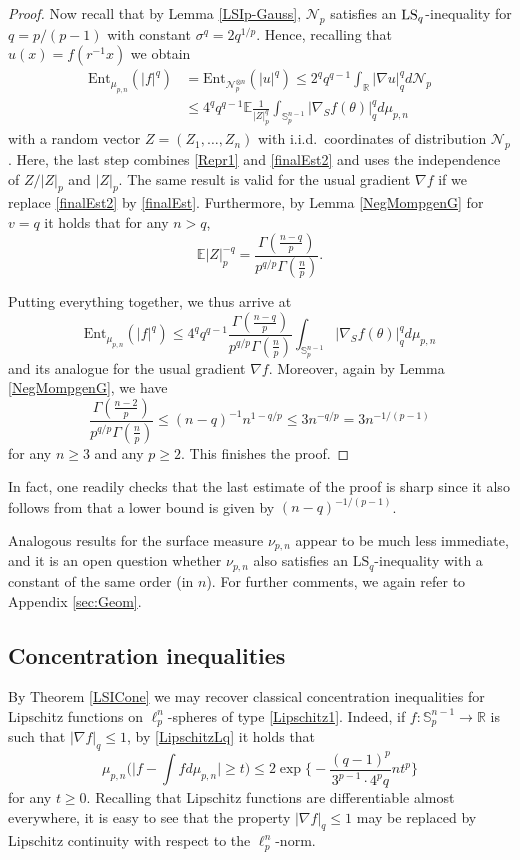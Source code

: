 \documentclass[a4paper,12pt]{amsart}
\numberwithin{equation}{section}
\theoremstyle{remark}
\def\E{{\mathbb E}}
\def\R{{\mathbb R}}
\def\S{{\mathbb S}}
\def\LSq{{\rm LS}_q}
\begin{document}
\begin{proof}
Now recall that by Lemma \ref{LSIp-Gauss}, $\mathcal{N}_p$ satisfies an $\LSq$-inequality for $q=p/(p-1)$ with constant $\sigma^q = 2 q^{1/p}$. Hence, recalling that $u(x) = f(r^{-1}x)$ we obtain
\begin{align*}
\mathrm{Ent}_{\mu_{p,n}}(|f|^q) &= \mathrm{Ent}_{\mathcal{N}_p^{\otimes n}}(|u|^q) \le 2^q q^{q-1} \int_{\R} \lvert \nabla u \rvert_q^{q} d\mathcal{N}_p\\
&\le 4^q q^{q-1} \E \frac{1}{\lvert Z \rvert_p^{q}} \int_{\S_p^{n-1}} \lvert \nabla_S f(\theta) \rvert_q^q d \mu_{p,n}
\end{align*}
with a random vector $Z=(Z_1,\ldots,Z_n)$ with i.i.d.\ coordinates of distribution $\mathcal{N}_p$. Here, the last step combines \eqref{Repr1} and \eqref{finalEst2} and uses the independence of $Z/\lvert Z \rvert_p$ and $\lvert Z \rvert_p$. The same result is valid for the usual gradient $\nabla f$ if we replace \eqref{finalEst2} by \eqref{finalEst}. Furthermore, by Lemma \ref{NegMompgenG} for $v=q$ it holds that for any $n > q$,
\[
\E  \lvert Z\rvert_p^{-q} = \frac {\Gamma(\frac{n-q}{p})}{p^{q/p} \Gamma(\frac n p)}.
\]

Putting everything together, we thus arrive at
\[
\mathrm{Ent}_{\mu_{p,n}}(|f|^q) \le 4^q q^{q-1} \frac {\Gamma(\frac{n-q}{p})}{p^{q/p}\Gamma(\frac n p)} \int_{\S_p^{n-1}} \lvert \nabla_S f(\theta) \rvert_q^q d \mu_{p,n}
\]
and its analogue for the usual gradient $\nabla f$. Moreover, again by Lemma \ref{NegMompgenG}, we have
\[
\frac{\Gamma(\frac{n-2}{p})}{p^{q/p} \Gamma(\frac n p)} \le (n-q)^{-1} n^{1-q/p} \le 3 n^{-q/p} = 3 n^{-1/(p-1)}
\]
for any $n \ge 3$ and any $p \ge 2$. This finishes the proof.
\end{proof}

In fact, one readily checks that the last estimate of the proof is sharp since it also follows from \cite[Th.\ 2]{Jam13} that a lower bound is given by $(n-q)^{-1/(p-1)}$.

Analogous results for the surface measure $\nu_{p,n}$ appear to be much less immediate, and it is an open question whether $\nu_{p,n}$ also satisfies an $\mathrm{LS}_q$-inequality with a constant of the same order (in $n$). For further comments, we again refer to Appendix \ref{sec:Geom}.

\subsection{Concentration inequalities}
By Theorem \ref{LSICone} we may recover classical concentration inequalities for Lipschitz functions on $\ell_p^n$-spheres of type \eqref{Lipschitz1}. Indeed, if $f \colon \S_p^{n-1} \to \R$ is such that $|\nabla f|_q \le 1$, by \eqref{LipschitzLq} it holds that
\begin{equation}\label{1stOrderCone}
    \mu_{p,n}\Big(\Big|f - \int f d\mu_{p,n}\Big| \ge t\Big) \le 2 \exp\Big\{ - \frac{(q-1)^p}{3^{p-1} \cdot 4^p q} n t^p\Big\}
\end{equation}
for any $t \ge 0$. Recalling that Lipschitz functions are differentiable almost everywhere, it is easy to see that the property $|\nabla f|_q \le 1$ may be replaced by Lipschitz continuity with respect to the $\ell_p^n$-norm.
\end{document}

